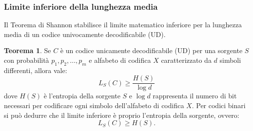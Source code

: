 \documentclass{article}
\theoremstyle{definition}
\newtheorem{theorem}{Teorema}[section] %
\numberwithin{equation}{section}
\begin{document}
\subsubsection{Limite inferiore della lunghezza media}
Il Teorema di Shannon stabilisce il limite matematico inferiore per la lunghezza media di un codice univocamente decodificabile (UD).
\begin{theorem}
    Se $C$ è un codice unicamente decodificabile (UD) per una sorgente $S$ con probabilità $p_1,p_2,\ldots,p_m$ e alfabeto di codifica $X$ caratterizzato da $d$ simboli differenti, allora vale:
    \begin{equation}
        L_S(C) \geq \frac{H(S)}{\log d}
    \end{equation}
    dove $H(S)$ è l'entropia della sorgente $S$ e $\log d$ rappresenta il numero di bit necessari per codificare ogni simbolo dell'alfabeto di codifica $X$. Per codici binari si può dedurre che il limite inferiore è proprio l'entropia della sorgente, ovvero:
    \[
        L_S(C) \geq H(S).
    \]
\end{theorem}
\end{document}
